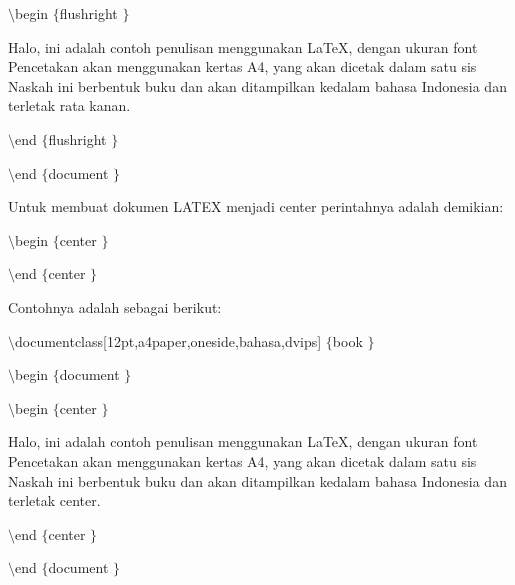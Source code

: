\begin{itemize}
{\fontsize{10pt}{10pt}\selectfont  $  \setminus  $begin $  \{  $flushright $  \}  $} \par
\vspace{10pt}
{\fontsize{10pt}{10pt}\selectfont Halo, ini adalah contoh penulisan menggunakan LaTeX, dengan ukuran font Pencetakan akan menggunakan kertas A4, yang akan dicetak dalam satu sis Naskah ini berbentuk buku dan akan ditampilkan kedalam bahasa Indonesia dan terletak rata kanan.} \par
\vspace{10pt}
{\fontsize{10pt}{10pt}\selectfont  $  \setminus  $end $  \{  $flushright $  \}  $} \par
{\fontsize{10pt}{10pt}\selectfont  $  \setminus  $end $  \{  $document $  \}  $} \par
\vspace{10pt}
Untuk membuat dokumen LATEX menjadi center perintahnya adalah demikian: \par
{\fontsize{10pt}{10pt}\selectfont  $  \setminus  $begin $  \{  $center $  \}  $} \par
{\fontsize{10pt}{10pt}\selectfont [kalimat]} \par
{\fontsize{10pt}{10pt}\selectfont  $  \setminus  $end $  \{  $center $  \}  $} \par
\vspace{10pt}
Contohnya adalah sebagai berikut: \par
{\fontsize{10pt}{10pt}\selectfont  $  \setminus  $documentclass[12pt,a4paper,oneside,bahasa,dvips] $  \{  $book $  \}  $ \hspace*{0.5in} } \par
{\fontsize{10pt}{10pt}\selectfont  $  \setminus  $begin $  \{  $document $  \}  $} \par
{\fontsize{10pt}{10pt}\selectfont  $  \setminus  $begin $  \{  $center $  \}  $} \par
\vspace{9pt}
{\fontsize{10pt}{10pt}\selectfont Halo, ini adalah contoh penulisan menggunakan LaTeX, dengan ukuran font Pencetakan akan menggunakan kertas A4, yang akan dicetak dalam satu sis Naskah ini berbentuk buku dan akan ditampilkan kedalam bahasa Indonesia dan terletak center.} \par
\vspace{9pt}
{\fontsize{10pt}{10pt}\selectfont  $  \setminus  $end $  \{  $center $  \}  $} \par
{\fontsize{10pt}{10pt}\selectfont  $  \setminus  $end $  \{  $document $  \}  $} \par

\end{itemize}
